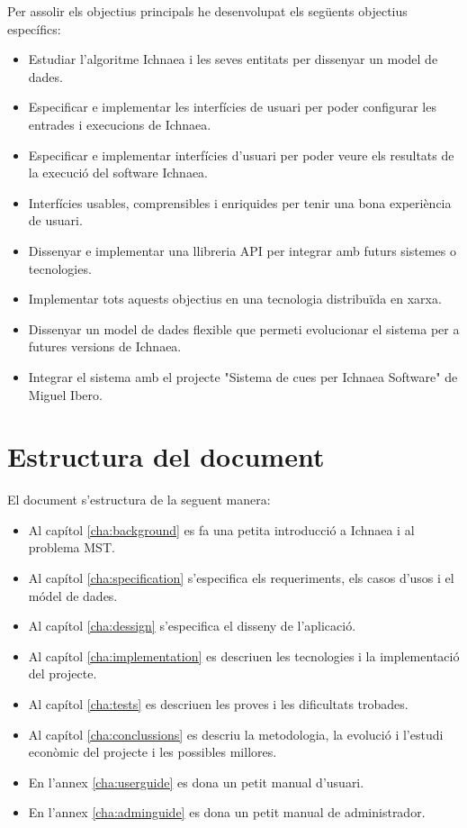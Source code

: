 Per assolir els objectius principals he desenvolupat els següents objectius específics:
\begin{itemize}
\item Estudiar l'algoritme Ichnaea i les seves entitats per dissenyar un model de dades.
\item Especificar e implementar les interf\'{i}cies de usuari per poder configurar les entrades i execucions de Ichnaea.
\item Especificar e implementar interf\'{i}cies d'usuari per poder veure els resultats de la execuci\'{o} del software Ichnaea. 
\item Interf\'{i}cies usables, comprensibles i enriquides per tenir una bona experiència de usuari. 
\item Dissenyar e implementar una llibreria API per integrar amb futurs sistemes o tecnologies.
\item Implementar tots aquests objectius en una tecnologia distribuïda en xarxa. 
\item Dissenyar un model de dades flexible que permeti evolucionar el sistema per a futures versions de Ichnaea.
\item Integrar el sistema amb el projecte "Sistema de cues per Ichnaea Software" de Miguel Ibero.
\end{itemize}

\section{Estructura del document}
El document s'estructura de la seguent manera:
\begin{itemize}
\item Al cap\'{i}tol \ref{cha:background} es fa una petita introducci\'{o} a Ichnaea i al problema MST. 
\item Al cap\'{i}tol \ref{cha:specification} s'especifica els requeriments, els casos d'usos i el m\'{o}del de dades.
\item Al cap\'{i}tol \ref{cha:dessign} s'especifica el disseny de l'aplicació.
\item Al capítol \ref{cha:implementation} es descriuen les tecnologies i la implementació del projecte.
\item Al capítol \ref{cha:tests} es descriuen les proves i les dificultats trobades.
\item Al cap\'{i}tol \ref{cha:conclussions} es descriu la metodologia, la evolució i l'estudi econòmic del projecte i les possibles millores.
\item En l'annex \ref{cha:userguide} es dona un petit manual d'usuari.
\item En l'annex \ref{cha:adminguide} es dona un petit manual de administrador.
\end{itemize}

